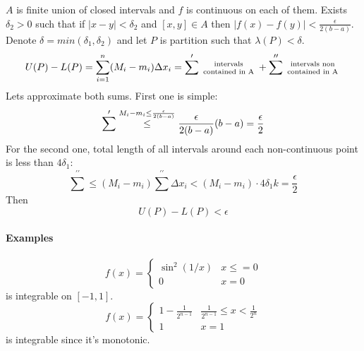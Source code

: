 $A$ is finite union of closed intervals and $f$ is continuous on each of them. Exists $\delta_2 > 0$ such that if $|x-y| < \delta_2$ and $[x,y] \in A$ then $|f(x)-f(y)| < \frac{\epsilon}{2(b-a)}$. Denote $\delta = min(\delta_1, \delta_2)$ and let $P$ is partition such that $\lambda(P) < \delta$.
$$U(P)-L(P) = \sum_{i=1}^{n} (M_i-m_i) \Delta x_i = \sum^\prime \parbox{2cm}{\centering \scriptsize intervals contained in A} +  \sum^{\prime\prime} \parbox{2cm}{\centering \scriptsize intervals non contained in A} $$
Lets approximate both sums. First one is simple:
$$\sum^\prime \stackrel{\scriptsize M_i-m_i \leq \frac{\epsilon}{2(b-a)}}{\leq} \frac{\epsilon}{2(b-a)}(b-a) = \frac{\epsilon}{2}$$
For the second one, total length of all intervals around each non-continuous point is less than $4\delta_1$:
$$\sum^{\prime\prime} \leq (M_i-m_i)\sum^{\prime\prime} \Delta x_i < (M_i-m_i) \cdot 4\delta_1 k = \frac{\epsilon}{2}$$
Then 
$$U(P)-L(P) < \epsilon$$
\paragraph{Examples}
$$f(x) = \begin{cases}
\sin^2(1/x)&x\leq=0\\ 0&x=0
\end{cases}$$
is integrable on $[-1,1]$.
$$f(x) = \begin{cases}
1-\frac{1}{2^{n-1}}&\frac{1}{2^{n-1}}\leq x < \frac{1}{2^{n}}\\1&x=1
\end{cases}$$
is integrable since it's monotonic.